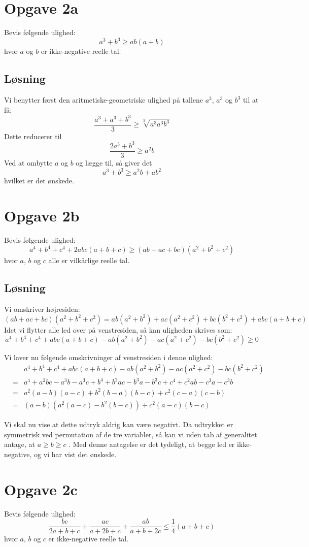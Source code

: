 \documentclass[12pt,oneside,a4paper]{article}
\newcommand{\bas}{\begin{eqnarray*}}
\newcommand{\eas}{\end{eqnarray*}}
\begin{document}
\section{Opgave 2a}
Bevis følgende ulighed:
$$
a^3+b^3 \ge ab(a+b)
$$
hvor $a$ og $b$ er ikke-negative reelle tal.

\subsection{Løsning}

Vi benytter først den aritmetiske-geometriske ulighed på tallene $a^3$, $a^3$ og $b^3$ til at få:
$$
\frac{a^3+a^3+b^3}{3} \ge \sqrt[3]{a^3 a^3 b^3}
$$
Dette reducerer til
$$
\frac{2a^3+b^3}{3} \ge a^2b
$$
Ved at ombytte $a$ og $b$ og lægge til, så giver det
$$
a^3+b^3 \ge a^2b + ab^2
$$
hvilket er det ønskede.

\section{Opgave 2b}
Bevis følgende ulighed:
$$
a^4+b^4+c^4+2abc(a+b+c) \ge (ab+ac+bc)(a^2+b^2+c^2)
$$
hvor $a$, $b$ og $c$ alle er vilkårlige reelle tal.

\subsection{Løsning}

Vi omskriver højresiden:
$$
(ab+ac+bc)(a^2+b^2+c^2) = ab(a^2+b^2) + ac(a^2+c^2) + bc(b^2+c^2) + abc(a+b+c)
$$
Idet vi flytter alle led over på venstresiden, så kan uligheden skrives som:
$$
a^4+b^4+c^4+abc(a+b+c) - ab(a^2+b^2) - ac(a^2+c^2) - bc(b^2+c^2) \ge 0
$$

Vi laver nu følgende omskrivninger af venstresiden i denne ulighed:
\bas
&& a^4+b^4+c^4+abc(a+b+c) - ab(a^2+b^2) - ac(a^2+c^2) - bc(b^2+c^2) \\
&=& a^4+a^2bc-a^3b-a^3c + b^4+b^2ac-b^3a-b^3c + c^4+c^2ab-c^3a-c^3b \\
&=& a^2(a-b)(a-c) + b^2(b-a)(b-c) + c^2(c-a)(c-b) \\
&=& (a-b)\left(a^2(a-c)-b^2(b-c)\right) + c^2(a-c)(b-c) 
\eas

Vi skal nu vise at dette udtryk aldrig kan være negativt.  Da udtrykket er
symmetrisk ved permutation af de tre variabler, så kan vi uden tab af
generalitet antage, at $a \ge b \ge c$ .  Med denne antagelse er det tydeligt,
at begge led er ikke-negative, og vi har vist det ønskede.

\section{Opgave 2c}
Bevis følgende ulighed:
$$
\frac{bc}{2a+b+c} + \frac{ac}{a+2b+c} + \frac{ab}{a+b+2c} \le \frac 14 (a+b+c)
$$
hvor $a$, $b$ og $c$ er ikke-negative reelle tal.
\end{document}

